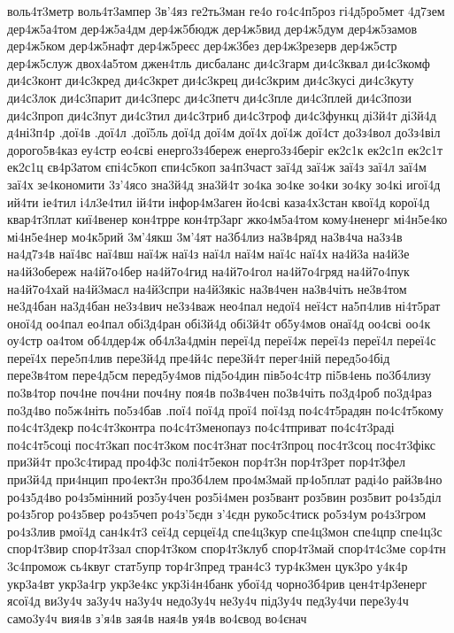 {воль4т3метр
воль4т3ампер
3в'4яз
ге2ть3ман
ге4о
го4с4п5роз
гі4д5ро5мет
4д7зем
дер4ж5а4том
дер4ж5а4дм
дер4ж5бюдж
дер4ж5вид
дер4ж5дум
дер4ж5замов
дер4ж5ком
дер4ж5нафт
дер4ж5реєс
дер4ж3без
дер4ж3резерв
дер4ж5стр
дер4ж5служ
двох4а5том
джен4тль
дисбаланс
ди4с3гарм
ди4с3квал
ди4с3комф
ди4с3конт
ди4с3кред
ди4с3крет
ди4с3крец
ди4с3крим
ди4с3кусі
ди4с3куту
ди4с3лок
ди4с3парит
ди4с3перс
ди4с3петч
ди4с3пле
ди4с3плей
ди4с3пози
ди4с3проп
ди4с3пут
ди4с3тил
ди4с3триб
ди4с3троф
ди4с3функц
ді3й4т
ді3й4д
д4ні3п4р
.дої4в
.дої4л
.дої5ль
дої4д
дої4м
дої4х
дої4ж
дої4ст
до3з4вол
до3з4віл
дорого5в4каз
еу4стр
ео4сві
енерго3з4береж
енерго3з4беріг
ек2с1к
ек2с1п
ек2с1т
ек2с1ц
єв4р3атом
єпі4с5коп
єпи4с5коп
за4п3част
заї4д
заї4ж
заї4з
заї4л
заї4м
заї4х
зе4кономити
3з'4ясо
зна3й4д
зна3й4т
зо4ка
зо4ке
зо4ки
зо4ку
зо4кі
игої4д
ий4ти
іе4тил
і4л3е4тил
ій4ти
інфор4м3аген
йо4сві
каза4х3стан
квої4д
корої4д
квар4т3плат
киї4венер
кон4трре
кон4тр3арг
жко4м5а4том
кому4ненерг
мі4н5е4ко
мі4н5е4нер
мо4к5рий
3м'4якш
3м'4ят
на3б4лиз
на3в4ряд
на3в4ча
на3з4в
на4д7з4в
наї4вс
наї4вш
наї4ж
наї4з
наї4л
наї4м
наї4с
наї4х
на4й3а
на4й3е
на4й3обереж
на4й7о4бер
на4й7о4гид
на4й7о4гол
на4й7о4гряд
на4й7о4пук
на4й7о4хай
на4й3масл
на4й3спри
на4й3якіс
на3в4чен
на3в4чіть
не3в4том
не3д4бан
на3д4бан
не3з4вич
не3з4важ
нео4пал
недої4
неї4ст
на5п4лив
ні4т5рат
оної4д
оо4пал
ео4пал
обі3д4ран
обі3й4д
обі3й4т
об5у4мов
онаї4д
оо4сві
оо4к
оу4стр
оа4том
об4лдер4ж
об4л3а4дмін
переї4д
переї4ж
переї4з
переї4л
переї4с
переї4х
пере5п4лив
пере3й4д
пре4й4с
пере3й4т
перег4ній
перед5о4бід
пере3в4том
пере4д5см
перед5у4мов
під5о4дин
пів5о4с4тр
пі5в4ень
по3б4лизу
по3в4тор
поч4не
поч4ни
поч4ну
поя4в
по3в4чен
по3в4чіть
по3д4роб
по3д4раз
по3д4во
по5ж4ніть
по5з4бав
.пої4
пої4д
прої4
пої4зд
по4с4т5радян
по4с4т5кому
по4с4т3декр
по4с4т3контра
по4с4т3менопауз
по4с4тприват
по4с4т3раді
по4с4т5соці
пос4т3кап
пос4т3ком
пос4т3нат
пос4т3проц
пос4т3соц
пос4т3фікс
при3й4т
про3с4тирад
про4ф3с
полі4т5екон
пор4т3н
пор4т3рет
пор4т3фел
при3й4д
при4нцип
про4ект3н
про3б4лем
про4м3май
пр4о5плат
раді4о
рай3в4но
ро4з5д4во
ро4з5мінний
роз5у4чен
роз5і4мен
роз5вант
роз5вин
роз5вит
ро4з5діл
ро4з5гор
ро4з5вер
ро4з5чеп
ро4з'5єдн
з'4єдн
руко5с4тиск
ро5з4ум
ро4з3гром
ро4з3лив
рмої4д
сан4к4т3
сеї4д
серцеї4д
спе4ц3кур
спе4ц3мон
спе4цпр
спе4ц3с
спор4т3вир
спор4т3зал
спор4т3ком
спор4т3клуб
спор4т3май
спор4т4с3ме
сор4тн
3с4промож
сь4квуг
стат5упр
тор4г3пред
тран4с3
тур4к3мен
цук3ро
у4к4р
укр3а4вт
укр3а4гр
укр3е4кс
укр3і4н4банк
убої4д
чорно3б4рив
цен4т4р3енерг
ясої4д
ви3у4ч
за3у4ч
на3у4ч
недо3у4ч
не3у4ч
під3у4ч
пед3у4чи
пере3у4ч
само3у4ч
вия4в
з'я4в
зая4в
ная4в
уя4в
во4євод
во4єнач
}
